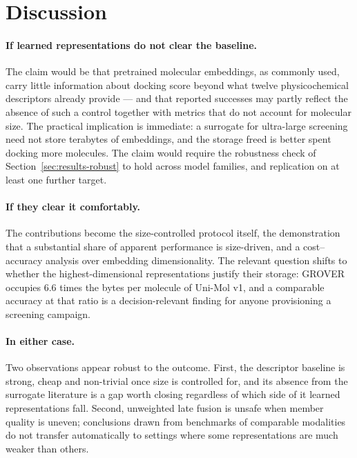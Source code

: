 \section{Discussion}
\label{sec:discussion}


\paragraph{If learned representations do not clear the baseline.}
The claim would be that pretrained molecular embeddings, as commonly used,
carry little information about docking score beyond what twelve
physicochemical descriptors already provide --- and that reported successes
may partly reflect the absence of such a control together with metrics that do
not account for molecular size. The practical implication is immediate: a
surrogate for ultra-large screening need not store terabytes of embeddings,
and the storage freed is better spent docking more molecules. The claim would
require the robustness check of Section~\ref{sec:results-robust} to hold across
model families, and replication on at least one further target.

\paragraph{If they clear it comfortably.}
The contributions become the size-controlled protocol itself, the demonstration
that a substantial share of apparent performance is size-driven, and a
cost--accuracy analysis over embedding dimensionality. The relevant question
shifts to whether the highest-dimensional representations justify their
storage: GROVER occupies \num{6.6} times the bytes per molecule of Uni-Mol v1,
and a comparable accuracy at that ratio is a decision-relevant finding for
anyone provisioning a screening campaign.

\paragraph{In either case.}
Two observations appear robust to the outcome. First, the descriptor baseline
is strong, cheap and non-trivial once size is controlled for, and its absence
from the surrogate literature is a gap worth closing regardless of which side
of it learned representations fall. Second, unweighted late fusion is unsafe
when member quality is uneven; conclusions drawn from benchmarks of comparable
modalities do not transfer automatically to settings where some
representations are much weaker than others.
